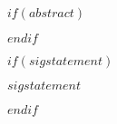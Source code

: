 \begin{frontmatter}

$if(abstract)$
\begin{abstract}
$abstract$
\end{abstract}
$endif$


$if(sigstatement)$
\begin{sigstatement}
$sigstatement$
\end{sigstatement}
$endif$


\end{frontmatter}
